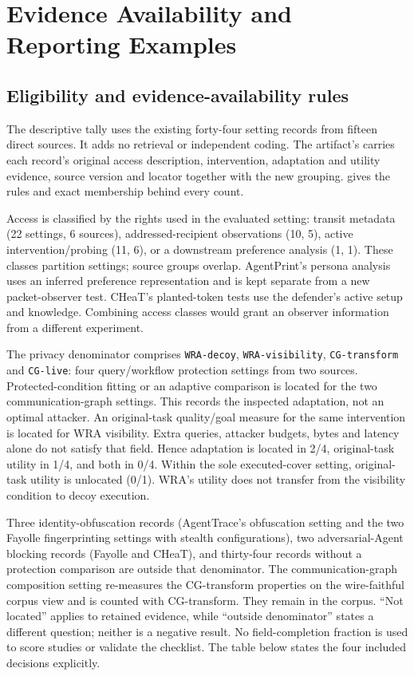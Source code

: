 \section{Evidence Availability and Reporting Examples}\label{supp:reporting-examples}
\subsection{Eligibility and evidence-availability rules}
The descriptive tally uses the existing forty-four setting records from fifteen direct sources. It adds no retrieval or independent coding. The artifact's  carries each record's original access description, intervention, adaptation and utility evidence, source version and locator together with the new grouping.  gives the rules and exact membership behind every count.

Access is classified by the rights used in the evaluated setting: transit metadata (22 settings, 6 sources), addressed-recipient observations (10, 5), active intervention/probing (11, 6), or a downstream preference analysis (1, 1). These classes partition settings; source groups overlap. AgentPrint's persona analysis uses an inferred preference representation and is kept separate from a new packet-observer test. CHeaT's planted-token tests use the defender's active setup and knowledge. Combining access classes would grant an observer information from a different experiment.

The privacy denominator comprises \texttt{WRA-decoy}, \texttt{WRA-visibility}, \texttt{CG-transform} and \texttt{CG-live}: four query/workflow protection settings from two sources. Protected-condition fitting or an adaptive comparison is located for the two communication-graph settings. This records the inspected adaptation, not an optimal attacker. An original-task quality/goal measure for the same intervention is located for WRA visibility. Extra queries, attacker budgets, bytes and latency alone do not satisfy that field. Hence adaptation is located in 2/4, original-task utility in 1/4, and both in 0/4. Within the sole executed-cover setting, original-task utility is unlocated (0/1). WRA's utility does not transfer from the visibility condition to decoy execution.

Three identity-obfuscation records (AgentTrace's obfuscation setting and the two Fayolle fingerprinting settings with stealth configurations), two adversarial-Agent blocking records (Fayolle and CHeaT), and thirty-four records without a protection comparison are outside that denominator. The communication-graph composition setting re-measures the CG-transform properties on the wire-faithful corpus view and is counted with CG-transform. They remain in the corpus. ``Not located'' applies to retained evidence, while ``outside denominator'' states a different question; neither is a negative result. No field-completion fraction is used to score studies or validate the checklist. The table below states the four included decisions explicitly.

